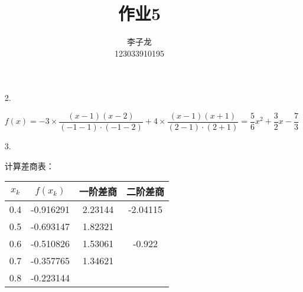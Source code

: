 \documentclass{sjtuarticle}
\title{作业5}
\author{李子龙\\123033910195}
\begin{document}
\maketitle


\begin{itemize}
    \item[2.] \begin{solution}
    \begin{equation*}
        f(x)=-3\times \frac{(x-1)(x-2)}{(-1-1)\cdot (-1-2)}+4\times \frac{(x-1)(x+1)}{(2-1)\cdot (2+1)}=\frac{5}{6}x^2+\frac{3}{2}x-\frac{7}{3}
    \end{equation*}
    \end{solution}
    \item[3.] \begin{solution}
        计算差商表：
        
        \begin{table}[H]
            \centering
            \begin{tabular}{cccc}
                \toprule
                $x_k$ & $f(x_k)$ & 一阶差商 & 二阶差商 \\
                \midrule
                0.4 & -0.916291 & 2.23144 & -2.04115 \\
                0.5 & -0.693147 & 1.82321 & \\
                0.6 & -0.510826 & 1.53061 & -0.922 \\
                0.7 & -0.357765 & 1.34621 &\\
                0.8 & -0.223144 & \\
                \bottomrule
            \end{tabular}
        \end{table}


\end{solution}
\end{itemize}
\end{document}
